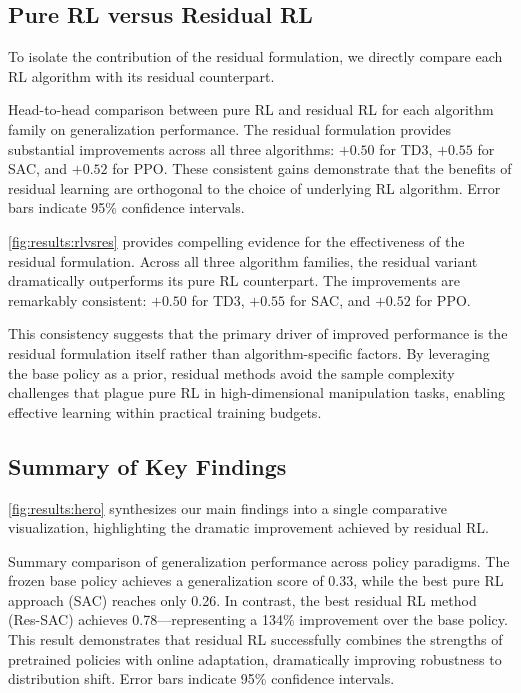 \subsection{Pure RL versus Residual RL}
\label{sec:results:pure-vs-residual}

To isolate the contribution of the residual formulation, we directly compare each \ac{RL} algorithm with its residual counterpart.

{Head-to-head comparison between pure \ac{RL} and residual \ac{RL} for each algorithm family on generalization performance. The residual formulation provides substantial improvements across all three algorithms: $+0.50$ for TD3, $+0.55$ for SAC, and $+0.52$ for PPO. These consistent gains demonstrate that the benefits of residual learning are orthogonal to the choice of underlying \ac{RL} algorithm. Error bars indicate 95\% confidence intervals.}

\autoref{fig:results:rlvsres} provides compelling evidence for the effectiveness of the residual formulation. Across all three algorithm families, the residual variant dramatically outperforms its pure \ac{RL} counterpart. The improvements are remarkably consistent: $+0.50$ for TD3, $+0.55$ for SAC, and $+0.52$ for PPO.

This consistency suggests that the primary driver of improved performance is the residual formulation itself rather than algorithm-specific factors. By leveraging the base policy as a prior, residual methods avoid the sample complexity challenges that plague pure \ac{RL} in high-dimensional manipulation tasks, enabling effective learning within practical training budgets.

\subsection{Summary of Key Findings}
\label{sec:results:summary}

\autoref{fig:results:hero} synthesizes our main findings into a single comparative visualization, highlighting the dramatic improvement achieved by residual \ac{RL}.

{Summary comparison of generalization performance across policy paradigms. The frozen base policy achieves a generalization score of 0.33, while the best pure \ac{RL} approach (SAC) reaches only 0.26. In contrast, the best residual \ac{RL} method (Res-SAC) achieves 0.78---representing a 134\% improvement over the base policy. This result demonstrates that residual \ac{RL} successfully combines the strengths of pretrained policies with online adaptation, dramatically improving robustness to distribution shift. Error bars indicate 95\% confidence intervals.}

